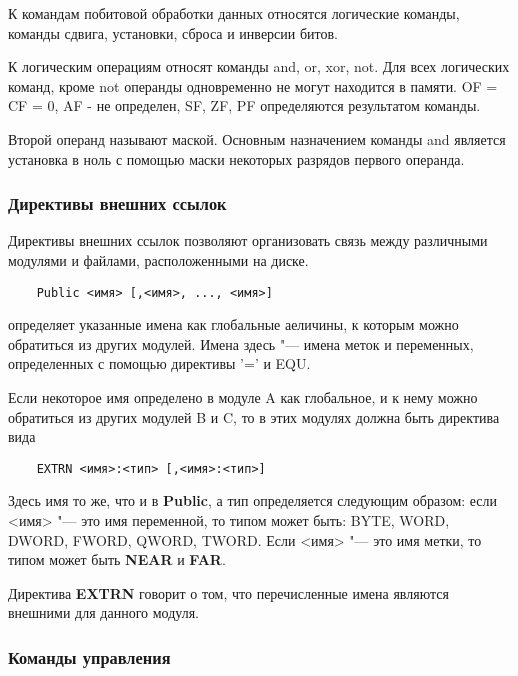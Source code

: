 К командам побитовой обработки данных относятся логические команды, команды сдвига, установки, сброса и инверсии битов.

К логическим операциям относят команды and, or, xor, not. Для всех логических команд, кроме not операнды одновременно
не могут находится в памяти. OF = CF = 0, AF - не определен, SF, ZF, PF определяются результатом команды.

Второй операнд называют маской. Основным назначением команды and является установка в ноль с помощью маски
некоторых разрядов первого операнда. 

\subsubsection{Директивы внешних ссылок}

Директивы внешних ссылок позволяют организовать связь между различными модулями и файлами, расположенными на диске.

\begin{verbatim}
    Public <имя> [,<имя>, ..., <имя>]
\end{verbatim}

определяет указанные имена как глобальные аеличины, к которым можно обратиться из других модулей. Имена здесь "---
имена меток и переменных, определенных с помощью директивы '=' и EQU.

Если некоторое имя определено в модуле A как глобальное, и к нему можно обратиться из других модулей B и C, то в этих
модулях должна быть директива вида

\begin{verbatim}
    EXTRN <имя>:<тип> [,<имя>:<тип>]
\end{verbatim}
Здесь имя то же, что и в \textbf{Public}, а тип определяется
следующим образом: если <имя> "--- это имя переменной, то типом
может быть: BYTE, WORD, DWORD, FWORD, QWORD, TWORD.
Если <имя> "--- это имя метки, то типом может быть \textbf{NEAR} и \textbf{FAR}.

Директива \textbf{EXTRN} говорит о том, что перечисленные имена являются
внешними для данного модуля.

\subsubsection{Команды управления}

